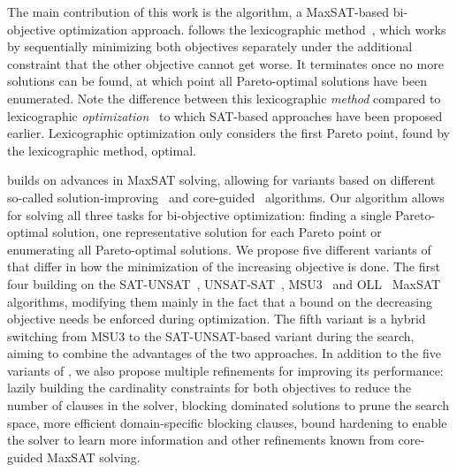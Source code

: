 The main contribution of this work is the \algname{} algorithm, a MaxSAT-based bi-objective optimization approach.
\algname{} follows the lexicographic method~\autocite{survey}, which works by sequentially minimizing both objectives separately under the additional constraint that the other objective cannot get worse.
It terminates once no more solutions can be found, at which point all Pareto-optimal solutions have been enumerated.
Note the difference between this lexicographic \emph{method} compared to lexicographic \emph{optimization}~\autocite{DBLP:conf/ijcai/ArgelichLS09,DBLP:journals/amai/Marques-SilvaAGL11} to which SAT-based approaches have been proposed earlier.
Lexicographic optimization only considers the first Pareto point, found by the lexicographic method, optimal.

\algname{} builds on advances in MaxSAT solving, allowing for variants based on different so-called solution-improving~\autocites{handbook2-maxsat,DBLP:journals/jsat/BerreP10,DBLP:journals/jsat/EenS06} and core-guided~\autocites{DBLP:journals/corr/abs-0712-1097,DBLP:conf/sat/AnsoteguiBL09,DBLP:conf/cp/MorgadoDM14,DBLP:journals/jsat/IgnatievMM19} algorithms.
Our algorithm allows for solving all three tasks for bi-objective optimization:
finding a single Pareto-optimal solution, one representative solution for each Pareto point or enumerating all Pareto-optimal solutions.
We propose five different variants of \algname{} that differ in how the minimization of the increasing objective is done.
The first four building on the SAT-UNSAT~\autocite{DBLP:journals/jsat/BerreP10}, UNSAT-SAT~\autocite{DBLP:conf/sat/FuM06}, MSU3~\autocite{DBLP:journals/corr/abs-0712-1097} and OLL~\autocite{DBLP:conf/cp/MorgadoDM14} MaxSAT algorithms, modifying them mainly in the fact that a bound on the decreasing objective needs be enforced during optimization.
The fifth variant is a hybrid switching from MSU3 to the SAT-UNSAT-based variant during the search, aiming to combine the advantages of the two approaches.
In addition to the five variants of \algname{}, we also propose multiple refinements for improving its performance:
lazily building the cardinality constraints for both objectives to reduce the number of clauses in the solver, blocking dominated solutions to prune the search space, more efficient domain-specific blocking clauses, bound hardening to enable the solver to learn more information and other refinements known from core-guided MaxSAT solving.

